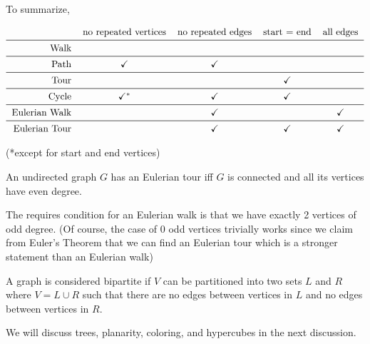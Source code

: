 To summarize,

\[\begin{tabular}{rcccc}
    & no repeated vertices & no repeated edges & start = end & all edges \\\midrule
Walk & & & & \\\midrule
Path & \checkmark & \checkmark & & \\\midrule
Tour & & & \checkmark & \\\midrule
Cycle & \checkmark$^\ast$ & \checkmark & \checkmark & \\\midrule
Eulerian Walk & & \checkmark & & \checkmark \\\midrule
Eulerian Tour & & \checkmark & \checkmark & \checkmark
\end{tabular} \]

(*except for start and end vertices)

\begin{theorem}
    An undirected graph $G$ has an Eulerian tour iff $G$ is connected and all its vertices have even degree. 
\end{theorem}

The requires condition for an Eulerian walk is that we have exactly 2 vertices of odd degree. (Of course, the case of 0 odd vertices trivially works since we claim from Euler's Theorem that we can find an Eulerian tour which is a stronger statement than an Eulerian walk)

\begin{definition}[Bipartite]
    A graph is considered bipartite if $V$ can be partitioned into two sets $L$ and $R$ where $V = L \cup R$ such that there are no edges between vertices in $L$ and no edges between vertices in $R$. 
\end{definition}

We will discuss trees, planarity, coloring, and hypercubes in the next discussion. 